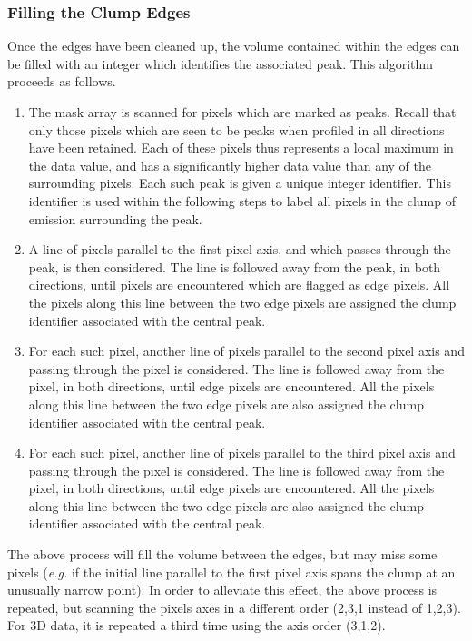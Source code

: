 \documentclass[twoside,11pt]{starlink}
\begin{document}
\subsubsection{Filling the Clump Edges}
Once the edges have been cleaned up, the volume contained within the
edges can be filled with an integer which identifies the associated peak.
This algorithm proceeds as follows.

\begin{enumerate}

\item The mask array is scanned for pixels which are marked as peaks.
Recall that only those pixels which are seen to be peaks when profiled
in all directions have been retained. Each of these pixels thus represents
a local maximum in the data value, and has a significantly higher data
value than any of the surrounding pixels. Each such peak is given a
unique integer identifier. This identifier is used within the following
steps to label all pixels in the clump of emission surrounding the peak.

\item A line of pixels parallel to the first pixel axis, and which passes
through the peak, is then considered. The line is followed away from the
peak, in both directions, until pixels are encountered which are flagged as
edge pixels. All the pixels along this line between the two edge pixels
are assigned the clump identifier associated with the central peak.

\item For each such pixel, another line of pixels parallel to the second
pixel axis and passing through the pixel is considered. The line is followed
away from the pixel, in both directions, until edge pixels are encountered.
All the pixels along this line between the two edge pixels are also assigned
the clump identifier associated with the central peak.

\item For each such pixel, another line of pixels parallel to the third
pixel axis and passing through the pixel is considered. The line is followed
away from the pixel, in both directions, until edge pixels are encountered.
All the pixels along this line between the two edge pixels are also assigned
the clump identifier associated with the central peak.

\end{enumerate}

The above process will fill the volume between the edges, but may miss
some pixels (\emph{e.g.} if the initial line parallel to the first pixel
axis spans the clump at an unusually narrow point). In order to alleviate
this effect, the above process is repeated, but scanning the pixels axes
in a different order (2,3,1 instead of 1,2,3). For 3D data, it is repeated
a third time using the axis order (3,1,2).
\end{document}
